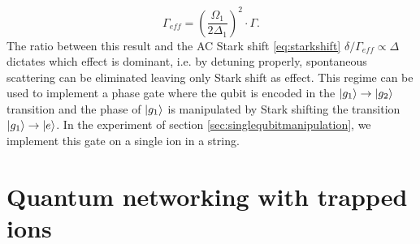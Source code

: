 \begin{equation}
\label{eq:gammaeff}
\Gamma_{eff} = \left(\frac{\Omega_1}{2 \Delta_1}\right)^2 \cdot \Gamma.
\end{equation}
The ratio between this result and the AC Stark shift \eqref{eq:starkshift} $\delta/\Gamma_{eff}\propto \Delta$ dictates which effect is dominant, i.e. by detuning properly, spontaneous scattering can be eliminated leaving only Stark shift as effect. This regime can be used to implement a phase gate where the qubit is encoded in the $\ket{g_1}\to\ket{g_2}$ transition and the phase of $\ket{g_1}$ is manipulated by Stark shifting the transition $\ket{g_1}\to \ket{e}$. In the experiment of section \ref{sec:singlequbitmanipulation}, we implement this gate on a single ion in a string.


\section{Quantum networking with trapped ions}
